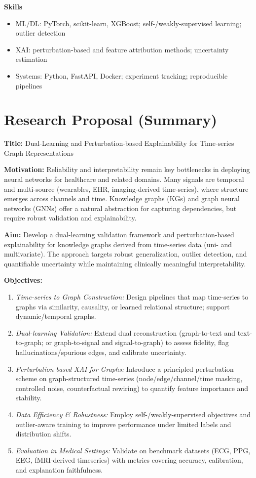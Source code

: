 \documentclass[11pt]{article}
\begin{document}
\textbf{Skills}
\begin{itemize}[leftmargin=*]
    \item ML/DL: PyTorch, scikit-learn, XGBoost; self-/weakly-supervised learning; outlier detection
    \item XAI: perturbation-based and feature attribution methods; uncertainty estimation
    \item Systems: Python, FastAPI, Docker; experiment tracking; reproducible pipelines
\end{itemize}

\vspace{0.6cm}

\section*{Research Proposal (Summary)}
\textbf{Title:} Dual-Learning and Perturbation-based Explainability for Time-series Graph Representations

\textbf{Motivation:} Reliability and interpretability remain key bottlenecks in deploying neural networks for healthcare and related domains. Many signals are temporal and multi-source (wearables, EHR, imaging-derived time-series), where structure emerges across channels and time. Knowledge graphs (KGs) and graph neural networks (GNNs) offer a natural abstraction for capturing dependencies, but require robust validation and explainability.

\textbf{Aim:} Develop a dual-learning validation framework and perturbation-based explainability for knowledge graphs derived from time-series data (uni- and multivariate). The approach targets robust generalization, outlier detection, and quantifiable uncertainty while maintaining clinically meaningful interpretability.

\textbf{Objectives:}
\begin{enumerate}[leftmargin=*]
    \item \textit{Time-series to Graph Construction:} Design pipelines that map time-series to graphs via similarity, causality, or learned relational structure; support dynamic/temporal graphs.
    \item \textit{Dual-learning Validation:} Extend dual reconstruction (graph-to-text and text-to-graph; or graph-to-signal and signal-to-graph) to assess fidelity, flag hallucinations/spurious edges, and calibrate uncertainty.
    \item \textit{Perturbation-based XAI for Graphs:} Introduce a principled perturbation scheme on graph-structured time-series (node/edge/channel/time masking, controlled noise, counterfactual rewiring) to quantify feature importance and stability.
    \item \textit{Data Efficiency \& Robustness:} Employ self-/weakly-supervised objectives and outlier-aware training to improve performance under limited labels and distribution shifts.
    \item \textit{Evaluation in Medical Settings:} Validate on benchmark datasets (ECG, PPG, EEG, fMRI-derived timeseries) with metrics covering accuracy, calibration, and explanation faithfulness.
\end{enumerate}
\end{document}
